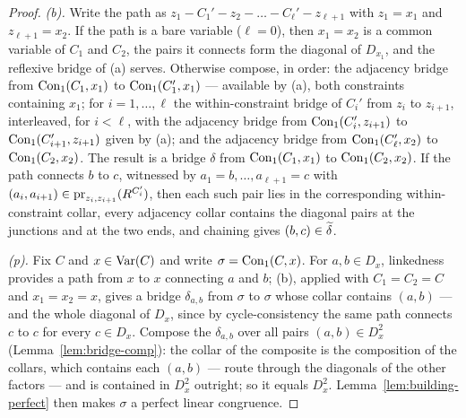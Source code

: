 \begin{proof}
\emph{(b).} Write the path as
$z_{1}-C_{1}'-z_{2}-\dots-C_{\ell}'-z_{\ell+1}$ with $z_{1}=x_{1}$ and
$z_{\ell+1}=x_{2}$. If the path is a bare variable ($\ell=0$), then
$x_{1}=x_{2}$ is a common variable of $C_{1}$ and $C_{2}$, the pairs it
connects form the diagonal of $D_{x_{1}}$, and the reflexive bridge of (a)
serves. Otherwise compose, in order: the adjacency bridge from
$\operatorname{Con}_1(C_{1},x_{1})$ to $\operatorname{Con}_1(C_{1}',x_{1})$ --- available by (a),
both constraints containing $x_{1}$; for $i=1,\dots,\ell$ the
within-constraint bridge of $C_{i}'$ from $z_{i}$ to $z_{i+1}$,
interleaved, for $i<\ell$, with the adjacency bridge from
$\operatorname{Con}_1(C_{i}',z_{i+1})$ to $\operatorname{Con}_1(C_{i+1}',z_{i+1})$ given by (a); and
the adjacency bridge from $\operatorname{Con}_1(C_{\ell}',x_{2})$ to
$\operatorname{Con}_1(C_{2},x_{2})$. The result is a bridge $\delta$ from
$\operatorname{Con}_1(C_{1},x_{1})$ to $\operatorname{Con}_1(C_{2},x_{2})$. If the path connects $b$
to $c$, witnessed by $a_{1}=b,\dots,a_{\ell+1}=c$ with
$(a_{i},a_{i+1})\in\operatorname*{pr}_{z_{i},z_{i+1}}(R^{C_{i}'})$, then each such pair
lies in the corresponding within-constraint collar, every adjacency collar
contains the diagonal pairs at the junctions and at the two ends, and
chaining gives $(b,c)\in\widetilde{\delta}$.

\emph{(p).} Fix $C$ and $x\in\operatorname{Var}(C)$ and write $\sigma=\operatorname{Con}_1(C,x)$. For
$a,b\in D_{x}$, linkedness provides a path from $x$ to $x$ connecting $a$
and $b$; (b), applied with $C_{1}=C_{2}=C$ and $x_{1}=x_{2}=x$, gives a
bridge $\delta_{a,b}$ from $\sigma$ to $\sigma$ whose collar contains
$(a,b)$ --- and the whole diagonal of $D_{x}$, since by cycle-consistency
the same path connects $c$ to $c$ for every $c\in D_{x}$. Compose the
$\delta_{a,b}$ over all pairs $(a,b)\in D_{x}^{2}$
(Lemma~\ref{lem:bridge-comp}): the collar of the composite is the
composition of the collars, which contains each $(a,b)$ --- route through
the diagonals of the other factors --- and is contained in $D_{x}^{2}$
outright; so it equals $D_{x}^{2}$. Lemma~\ref{lem:building-perfect} then
makes $\sigma$ a perfect linear congruence.
\end{proof}

